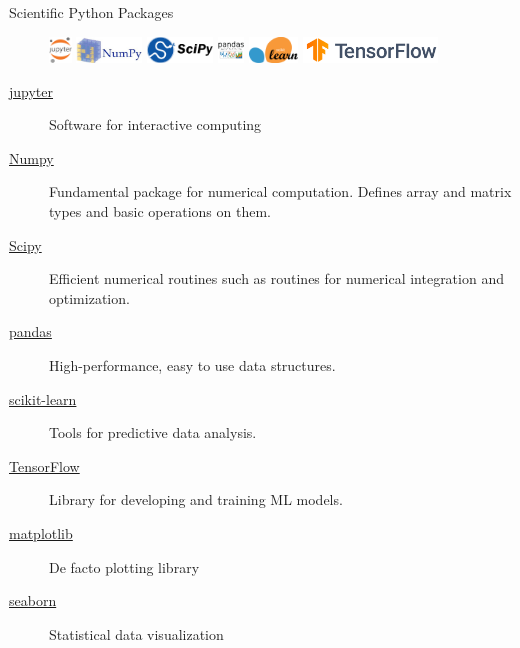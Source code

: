\documentclass[aspectratio=169]{beamer}
\begin{document}
\begin{frame}{Scientific Python Packages}
\begin{figure}
    \centering
    \includegraphics[height=0.7cm]{figures/jupyter-logo.png}
    \includegraphics[height=0.7cm]{figures/numpy-logo.jpeg}
    \includegraphics[height=0.7cm]{figures/scipy-logo.png}
    \includegraphics[height=0.7cm]{figures/pandas-logo.png}
    \includegraphics[height=0.7cm]{figures/scikit-learn-logo.png}
    \includegraphics[height=0.7cm]{figures/tensorflow-logo.png}
\end{figure}
    \begin{description}
        \item[\href{http://jupyter.org/}{jupyter}] Software for interactive computing
        \item[\href{http://www.scipy.org/}{Numpy}] Fundamental package for numerical computation. Defines array and matrix types and basic operations on them.
        \item[\href{http://www.scipy.org/}{Scipy}] Efficient numerical routines such as routines for numerical integration and optimization.
        \item[\href{http://pandas.pydata.org/}{pandas}] High-performance, easy to use data structures.
        \item[\href{http://scikit-learn.org/}{scikit-learn}] Tools for predictive data analysis.
        \item[\href{http://www.tensorflow.org/}{TensorFlow}] Library for developing and training ML models.
        \item[\href{http://matplotlib.org/}{matplotlib}] De facto plotting library
        \item[\href{http://seaborn.pydata.org/}{seaborn}] Statistical data visualization
    \end{description}
\end{frame}
\end{document}

